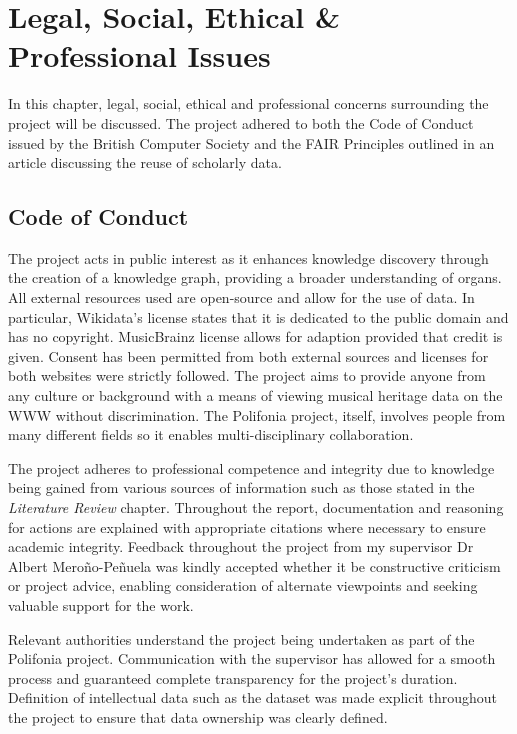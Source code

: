 \chapter{Legal, Social, Ethical \& Professional Issues} 
In this chapter, legal, social, ethical and professional concerns surrounding the project will be discussed. The project adhered to both the Code of Conduct issued by the British Computer Society \cite{bcs} and the FAIR Principles \cite{fairprinciples} outlined in an article discussing the reuse of scholarly data.

\section{Code of Conduct}
\hspace{0.5cm} The project acts in public interest as it enhances knowledge discovery through the creation of a knowledge graph, providing a broader understanding of organs. All external resources used are open-source and allow for the use of data. In particular, Wikidata's license \cite{wikidatalicense} states that it is dedicated to the public domain and has no copyright. MusicBrainz license \cite{musicbrainzlicense} allows for adaption provided that credit is given. Consent has been permitted from both external sources and licenses for both websites were strictly followed. The project aims to provide anyone from any culture or background with a means of viewing musical heritage data on the WWW without discrimination. The Polifonia project, itself, involves people from many different fields so it enables multi-disciplinary collaboration.  

The project adheres to professional competence and integrity due to knowledge being gained from various sources of information such as those stated in the \textit{Literature Review} chapter. Throughout the report, documentation and reasoning for actions are explained with appropriate citations where necessary to ensure academic integrity. Feedback throughout the project from my supervisor Dr Albert Mero{\~n}o-Pe{\~n}uela was kindly accepted whether it be constructive criticism or project advice, enabling consideration of alternate viewpoints and seeking valuable support for the work.

Relevant authorities understand the project being undertaken as part of the Polifonia project. Communication with the supervisor has allowed for a smooth process and guaranteed complete transparency for the project's duration. Definition of intellectual data such as the dataset was made explicit throughout the project to ensure that data ownership was clearly defined.

